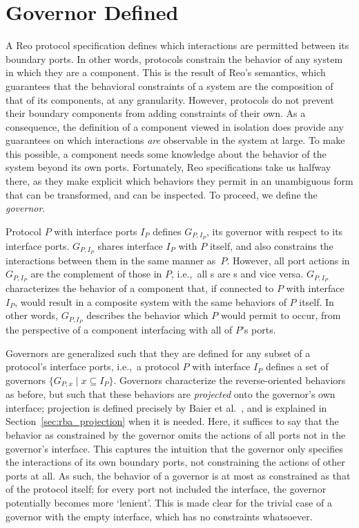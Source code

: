 \section{Governor Defined}
\label{sec:governor_defined}
A Reo protocol specification defines which interactions are permitted between its boundary ports. In other words, protocols constrain the behavior of any system in which they are a component. This is the result of Reo's semantics, which 
guarantees that the behavioral constraints of a system are the composition of that of its components, at any granularity. However, protocols do not prevent their boundary components from adding constraints of their own. As a consequence, the definition of a component viewed in isolation does provide any guarantees on which interactions \textit{are} observable in the system at large. To make this possible, a component needs some knowledge about the behavior of the system beyond its own ports. Fortunately, Reo specifications take us halfway there, as they make explicit which behaviors they permit in an unambiguous form that can be transformed, and can be inspected. To proceed, we define the \textit{governor}.

Protocol $P$ with interface ports $I_P$ defines $G_{P,I_P}$, its governor with respect to its interface ports. $G_{P,I_P}$ shares interface $I_P$ with $P$ itself, and also constrains the interactions between them in the same manner as~$P$. However, all port actions in $G_{P,I_P}$ are the complement of those in $P$, i.e.,\ all s are s and vice versa. $G_{P,I_P}$ characterizes the behavior of a component that, if connected to $P$ with interface $I_P$, would result in a composite system with the same behaviors of $P$ itself. In other words, $G_{P,I_P}$ describes the behavior which $P$ would permit to occur, from the perspective of a component interfacing with all of $P$'s ports.

Governors are generalized such that they are defined for any subset of a protocol's interface ports, i.e.,\ a protocol $P$ with interface $I_P$ defines a set of governors $\{G_{P,x} \; | \; x\subseteq I_P\}$. Governors characterize the reverse-oriented behaviors as before, but such that these behaviors are \textit{projected} onto the governor's own interface; projection is defined precisely by Baier et al.~\cite{baier2006modeling}, and is explained in Section~\ref{sec:rba_projection} when it is needed. Here, it suffices to say that the behavior as constrained by the governor omits the actions of all ports not in the governor's interface. This captures the intuition that the governor only specifies the interactions of its own boundary ports, not constraining the actions of other ports at all. As such, the behavior of a governor is at most as constrained as that of the protocol itself; for every port not included the interface, the governor potentially becomes more `lenient'. This is made clear for the trivial case of a governor with the empty interface, which has no constraints whatsoever.

